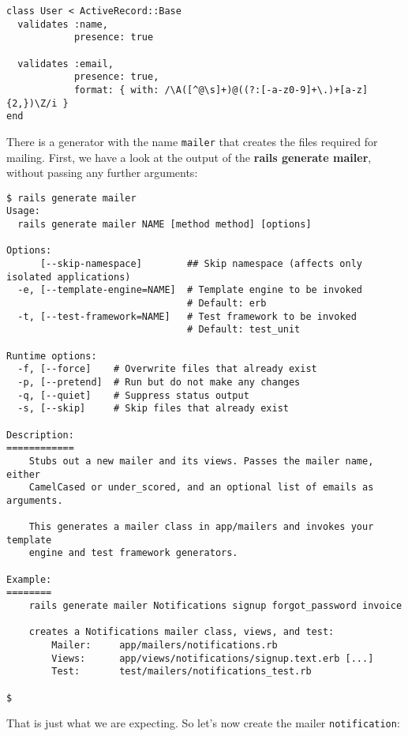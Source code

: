 \documentclass[a4paper]{book}
\begin{document}
\begin{shaded}\begin{verbatim}
class User < ActiveRecord::Base
  validates :name,
            presence: true

  validates :email,
            presence: true,
            format: { with: /\A([^@\s]+)@((?:[-a-z0-9]+\.)+[a-z]{2,})\Z/i }
end
\end{verbatim}\end{shaded}

There is a generator with the name \texttt{mailer} that creates the files required for mailing. First, we have a look at the output of the \textbf{rails generate mailer}, without passing any further arguments:

\begin{shaded}\begin{verbatim}
$ rails generate mailer
Usage:
  rails generate mailer NAME [method method] [options]

Options:
      [--skip-namespace]        ## Skip namespace (affects only isolated applications)
  -e, [--template-engine=NAME]  # Template engine to be invoked
                                # Default: erb
  -t, [--test-framework=NAME]   # Test framework to be invoked
                                # Default: test_unit

Runtime options:
  -f, [--force]    # Overwrite files that already exist
  -p, [--pretend]  # Run but do not make any changes
  -q, [--quiet]    # Suppress status output
  -s, [--skip]     # Skip files that already exist

Description:
============
    Stubs out a new mailer and its views. Passes the mailer name, either
    CamelCased or under_scored, and an optional list of emails as arguments.

    This generates a mailer class in app/mailers and invokes your template
    engine and test framework generators.

Example:
========
    rails generate mailer Notifications signup forgot_password invoice

    creates a Notifications mailer class, views, and test:
        Mailer:     app/mailers/notifications.rb
        Views:      app/views/notifications/signup.text.erb [...]
        Test:       test/mailers/notifications_test.rb

$
\end{verbatim}\end{shaded}

That is just what we are expecting. So let's now create the mailer \texttt{notification}:
\end{document}
